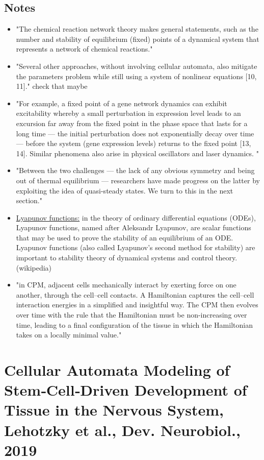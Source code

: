 \documentclass[11pt,a4paper]{article}
\begin{document}
\subsection*{Notes}
\begin{itemize}
\item "The chemical reaction network theory makes general statements, such as the number and stability of equilibrium (fixed) points of a dynamical system that represents a network of chemical reactions."
\item "Several other approaches, without involving cellular automata, also mitigate the parameters problem while still using a system of nonlinear equations [10, 11]." check that maybe
\item "For example, a fixed point of a gene network dynamics can exhibit excitability whereby a small perturbation in expression level leads to an excursion far away from the fixed point in the phase space that lasts for a long time — the initial perturbation does not exponentially decay over time — before the system (gene expression levels) returns to the fixed point [13, 14]. Similar phenomena also arise in physical oscillators and laser dynamics. "
\item "Between the two challenges — the lack of any obvious symmetry and being out of thermal equilibrium — researchers have made progress on the latter by exploiting the idea of quasi-steady states. We turn to this in the next section."
\item \underline{Lyapunov functions:} in the theory of ordinary differential equations (ODEs), Lyapunov functions, named after Aleksandr Lyapunov, are scalar functions that may be used to prove the stability of an equilibrium of an ODE. Lyapunov functions (also called Lyapunov’s second method for stability) are important to stability theory of dynamical systems and control theory. (wikipedia)
\item "in CPM, adjacent cells mechanically interact by exerting force on one another, through the cell–cell contacts. A Hamiltonian captures the cell–cell interaction energies in a simplified and insightful way. The CPM then evolves over time with the rule that the Hamiltonian must be non-increasing over time, leading to a final configuration of the tissue in which the Hamiltonian takes on a locally minimal value."
\end{itemize}

\section*{Cellular Automata Modeling of Stem‐Cell‐Driven Development of Tissue in the Nervous System, Lehotzky et al., Dev. Neurobiol., 2019}
\end{document}
